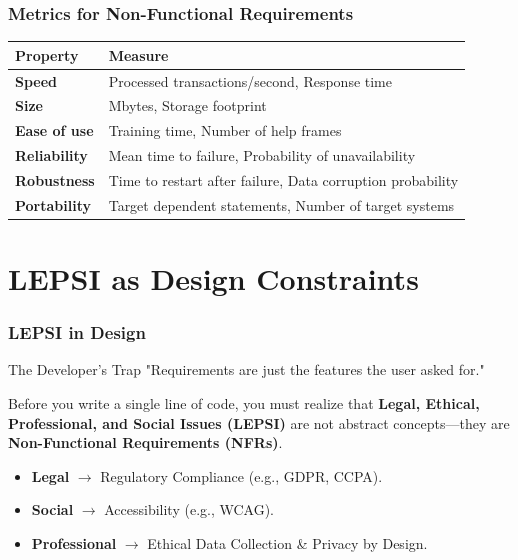 \documentclass[xcolor=table]{beamer}
\begin{document}
\begin{frame}
    \frametitle{Metrics for Non-Functional Requirements}
    \begin{table}
        \centering
        \small
        \begin{tabular}{|p{}|p{}|}
            \hline
                    \rowcolor{blue!20}
            \textbf{Property} & \textbf{Measure} \\
            \hline
            \textbf{Speed} & Processed transactions/second, Response time \\
                    \rowcolor{gray!20}
            \textbf{Size} & Mbytes, Storage footprint \\
            \textbf{Ease of use} & Training time, Number of help frames \\
                    \rowcolor{gray!20}
            \textbf{Reliability} & Mean time to failure, Probability of unavailability \\
            \textbf{Robustness} & Time to restart after failure, Data corruption probability \\
                    \rowcolor{gray!20}
            \textbf{Portability} & Target dependent statements, Number of target systems \\
            \hline
        \end{tabular}
    \end{table}
\end{frame}

\section{LEPSI as Design Constraints}

\begin{frame}
    \frametitle{LEPSI in Design}
    \begin{alertblock}{The Developer's Trap}
        "Requirements are just the features the user asked for."
    \end{alertblock}
    \vspace{0.3cm}
    Before you write a single line of code, you must realize that \textbf{Legal, Ethical, Professional, and Social Issues (LEPSI)} are not abstract concepts—they are \textbf{Non-Functional Requirements (NFRs)}.
    
    \vspace{0.3cm}
    \begin{itemize}
        \item \textbf{Legal} $\rightarrow$ Regulatory Compliance (e.g., GDPR, CCPA).
        \item \textbf{Social} $\rightarrow$ Accessibility (e.g., WCAG).
        \item \textbf{Professional} $\rightarrow$ Ethical Data Collection \& Privacy by Design.
    \end{itemize}
\end{frame}
\end{document}
